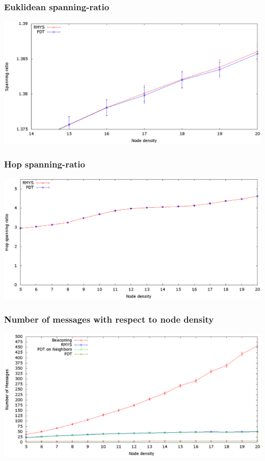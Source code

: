 \documentclass[compress]{beamer}
\begin{document}
\begin{frame} 
\frametitle{Euklidean spanning-ratio}
\center	\includegraphics[width=1.0\linewidth]{RMYS_PDT_SpanningRatio-hd.eps}
\end{frame}

\begin{frame} 
\frametitle{Hop spanning-ratio}
\center	\includegraphics[width=1.0\linewidth]{RMYS_PDT_HopSpanningRatio.eps}
\end{frame}


\begin{frame} 
\frametitle{Number of messages with respect to node density}
\center	\includegraphics[width=1.0\linewidth]{RMYS_PDT_Beaconing_Neighbors.eps}
\end{frame}
\end{document}
